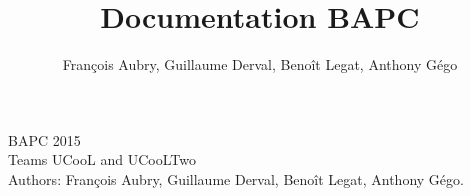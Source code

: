 \documentclass[2pt,a4paper]{article}
\author{François Aubry, Guillaume Derval, Benoît Legat, Anthony Gégo}
\title{Documentation BAPC}
\begin{document}
\begin{multicols}{2}
{\Huge BAPC 2015}\\
{\Large Teams UCooL and UCooLTwo}\\
Authors: François Aubry, Guillaume Derval, Benoît Legat, Anthony Gégo.
\tableofcontents







\end{multicols}
\end{document}
